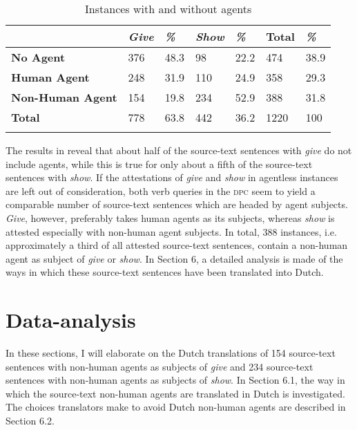 \documentclass[output=paper]{LSP/langsci}
\begin{document}
\begin{table}
     \centering
     \begin{tabularx}{\textwidth}{XXXXXXX}
     \lsptoprule
                  &  \textit{Give}   & \textit{\%}  & \textit{Show}  & \textit{\%} & Total & \textit{\%} \\ \midrule
       \textbf{No Agent}    & 376    & 48.3          & 98	           & 22.2      & 474   & 38.9 \\
       \textbf{Human Agent} & 248    & 31.9          & 110             & 24.9      & 358   & 29.3  \\
       \textbf{Non-Human Agent} & 154 & 19.8         & 234             & 52.9      & 388   & 31.8 \\  \midrule
       \textbf{Total}       & 778     & 63.8        & 442              & 36.2      & 1220  & 100  \\ 
  \lspbottomrule     
     \end{tabularx}
 
     \caption{Instances with and without agents}
     \label{tab:5.1}
 
   \end{table}

The results in  reveal that about half of the source-text sentences with \textit{give} do not include agents, while this is true for only about a fifth of the source-text sentences with \textit{show}. If the attestations of \textit{give} and \textit{show} in agentless instances are left out of consideration, both verb queries in the \textsc{dpc} seem to yield a comparable number of source-text sentences which are headed by agent subjects. \textit{Give}, however, preferably takes human agents as its subjects, whereas \textit{show} is attested especially with non-human agent subjects. In total, 388 instances, i.e. approximately a third of all attested source-text sentences, contain a non-human agent as subject of \textit{give} or \textit{show}. In Section 6, a detailed analysis is made of the ways in which these source-text sentences have been translated into Dutch. 

\section{Data-analysis}

In these sections, I will elaborate on the Dutch translations of 154 source-text sentences with non-human agents as subjects of \textit{give} and 234 source-text sentences with non-human agents as subjects of \textit{show}. In Section 6.1, the way in which the source-text non-human agents are translated in Dutch is investigated. The choices translators make to avoid Dutch non-human agents are described in Section 6.2.
  
\end{document}
